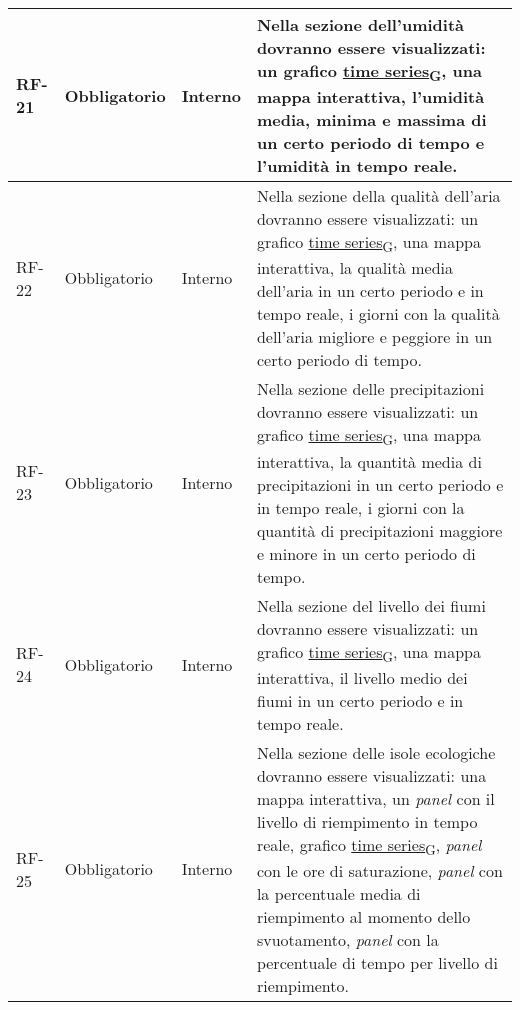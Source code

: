 \begin{longtable}{|>{\centering\arraybackslash}m{}|>{\centering\arraybackslash}m{}|>{\centering\arraybackslash}m{}|>{\centering\arraybackslash}m{}|}
	\\\hline
	RF-21           & Obbligatorio        & Interno                                                                                                           & Nella sezione dell'umidità dovranno essere visualizzati: un grafico \href{https://7last.github.io/docs/pb/documentazione-interna/glossario\#time-series}{time series\textsubscript{G}}, una mappa interattiva, l'umidità media, minima e massima di un certo periodo di tempo e l'umidità in tempo reale.
	\\\hline
	RF-22           & Obbligatorio        & Interno                                                                                                           & Nella sezione della qualità dell'aria dovranno essere visualizzati: un grafico \href{https://7last.github.io/docs/pb/documentazione-interna/glossario\#time-series}{time series\textsubscript{G}}, una mappa interattiva, la qualità media dell'aria in un certo periodo e in tempo reale, i giorni con la qualità dell'aria migliore e peggiore in un certo periodo di tempo.
	\\\hline
	RF-23           & Obbligatorio        & Interno                                                                                                           & Nella sezione delle precipitazioni dovranno essere visualizzati: un grafico \href{https://7last.github.io/docs/pb/documentazione-interna/glossario\#time-series}{time series\textsubscript{G}}, una mappa interattiva, la quantità media di precipitazioni in un certo periodo e in tempo reale, i giorni con la quantità di precipitazioni maggiore e minore in un certo periodo di tempo.
	\\\hline
	RF-24           & Obbligatorio        & Interno                                                                                                           & Nella sezione del livello dei fiumi dovranno essere visualizzati: un grafico \href{https://7last.github.io/docs/pb/documentazione-interna/glossario\#time-series}{time series\textsubscript{G}}, una mappa interattiva, il livello medio dei fiumi in un certo periodo e in tempo reale.
	\\\hline
	RF-25           & Obbligatorio        & Interno                                                                                                           & Nella sezione delle isole ecologiche dovranno essere visualizzati: una mappa interattiva, un \textit{panel} con il livello di riempimento in tempo reale, grafico \href{https://7last.github.io/docs/pb/documentazione-interna/glossario\#time-series}{time series\textsubscript{G}}, \textit{panel} con le ore di saturazione, \textit{panel} con la percentuale media di riempimento al momento dello svuotamento, \textit{panel} con la percentuale di tempo per livello di riempimento.

\end{longtable}
